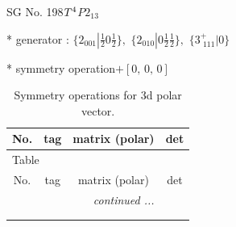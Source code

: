 \documentclass[fleqn,8pt]{jsarticle}
\begin{document}
\setcounter{MaxMatrixCols}{32}

\renewcommand{\tablename}{Table~}
\renewcommand{\figurename}{Figure~}
\begin{center}
\LARGE
SG No. 198\quad$T_{\rm }^{4}$\quad$P2_13$\quad[ cubic ]
\end{center}

* generator : $\{2{}_{001}|\frac{1}{2} 0 \frac{1}{2}\},\,\,\{2{}_{010}|0 \frac{1}{2} \frac{1}{2}\},\,\,\{3^{+}_{\,\,111}|0\}$

* symmetry operation\quad$+\left[ 0,\, 0,\, 0 \right]$
\renewcommand{\arraystretch}{1.3}
\begin{longtable}{cccc}
\caption{Symmetry operations for 3d polar vector.}
 \\
 \hline \hline
No. & tag & matrix (polar) & det \\ \hline \endfirsthead

\multicolumn{3}{l}{\tablename\ \thetable{}} \\
 \hline \hline
No. & tag & matrix (polar) & det \\ \hline \endhead

 \hline \hline
\multicolumn{3}{r}{\footnotesize\it continued ...} \\ \endfoot

 \hline \hline
\multicolumn{3}{r}{} \\ \endlastfoot


\end{longtable}
\end{document}
